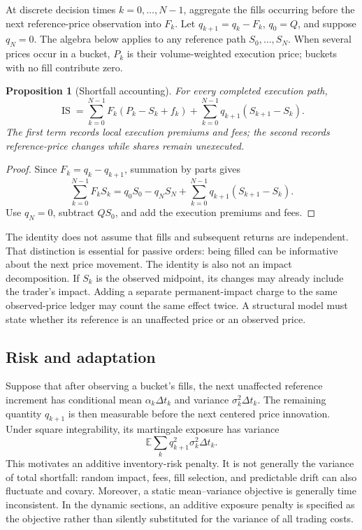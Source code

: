 \documentclass[11pt]{article}
\numberwithin{equation}{section}
\newtheorem{proposition}[theorem]{Proposition}
\theoremstyle{definition}
\theoremstyle{remark}
\newcommand{\E}{\mathbb{E}}
\theoremstyle{definition}
\begin{document}
At discrete decision times $k=0,\ldots,N-1$, aggregate the fills occurring before
the next reference-price observation into $F_k$. Let
$q_{k+1}=q_k-F_k$, $q_0=Q$, and suppose $q_N=0$. The algebra below applies to any
reference path $S_0,\ldots,S_N$. When several prices occur in a bucket, $P_k$
is their volume-weighted execution price; buckets with no fill contribute zero.

\begin{proposition}[Shortfall accounting]\label{prop:is}
For every completed execution path,
\begin{equation}\label{eq:decomp}
 \operatorname{IS}
 =\sum_{k=0}^{N-1}F_k(P_k-S_k+f_k)
  +\sum_{k=0}^{N-1}q_{k+1}(S_{k+1}-S_k).
\end{equation}
The first term records local execution premiums and fees; the second records
reference-price changes while shares remain unexecuted.
\end{proposition}
\begin{proof}
Since $F_k=q_k-q_{k+1}$, summation by parts gives
\[
 \sum_{k=0}^{N-1}F_kS_k
 =q_0S_0-q_NS_N+\sum_{k=0}^{N-1}q_{k+1}(S_{k+1}-S_k).
\]
Use $q_N=0$, subtract $QS_0$, and add the execution premiums and fees.
\end{proof}

The identity does not assume that fills and subsequent returns are independent.
That distinction is essential for passive orders: being filled can be informative
about the next price movement. The identity is also not an impact decomposition.
If $S_k$ is the observed midpoint, its changes may already include the trader's
impact. Adding a separate permanent-impact charge to the same observed-price
ledger may count the same effect twice. A structural model must state whether
its reference is an unaffected price or an observed price.

\subsection{Risk and adaptation}

Suppose that after observing a bucket's fills, the next unaffected reference
increment has conditional mean $\alpha_k\Delta t_k$ and variance
$\sigma_k^2\Delta t_k$. The remaining quantity $q_{k+1}$ is then measurable
before the next centered price innovation. Under square integrability, its
martingale exposure has variance
\begin{equation}\label{eq:exposure}
 \E\sum_k q_{k+1}^2\sigma_k^2\Delta t_k.
\end{equation}
This motivates an additive inventory-risk penalty. It is not generally the
variance of total shortfall: random impact, fees, fill selection, and predictable
drift can also fluctuate and covary. Moreover, a static mean--variance objective
is generally time inconsistent. In the dynamic sections, an additive exposure
penalty is specified as the objective rather than silently substituted for the
variance of all trading costs.
\end{document}
